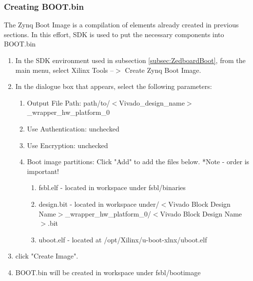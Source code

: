 \documentclass[12pt]{article}
\begin{document}
\subsubsection{Creating BOOT.bin}
The Zynq Boot Image is a compilation of elements already created in previous sections.  In this effort, SDK is used to put the necessary components into BOOT.bin
\begin{enumerate}
\item In the SDK environment used in subsection \ref{subsec:ZedboardBoot}, from the main menu, select Xilinx Tools --$>$ Create Zynq Boot Image.
\item In the dialogue box that appears, select the following parameters:
\begin{enumerate}
\item Output File Path: path/to/$<$Vivado\_design\_name$>$\_wrapper\_hw\_platform\_0
\item Use Authentication: unchecked
\item Use Encryption: unchecked
\item Boot image partitions: Click "Add" to add the files below. *Note - order is important!
\begin{enumerate}
\item fsbl.elf - located in workspace under fsbl/binaries
\item design.bit - located in workspace under/$<$Vivado Block Design Name$>$\_wrapper\_hw\_platform\_0/$<$Vivado Block Design Name$>$.bit
\item uboot.elf - located at /opt/Xilinx/u-boot-xlnx/uboot.elf
\end{enumerate}
\end{enumerate}
\item click "Create Image".
\item BOOT.bin will be created in workspace under fsbl/bootimage
\end{enumerate}
\end{document}
